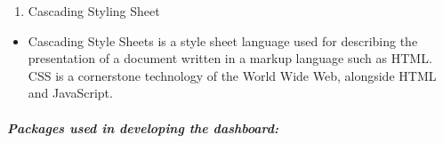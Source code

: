 \documentclass[
]{article}
\providecommand{\tightlist}{%
  \setlength{\itemsep}{0pt}\setlength{\parskip}{0pt}}
\begin{document}
\begin{enumerate}
\def\labelenumi{\arabic{enumi}.}
\setcounter{enumi}{1}
\tightlist
\item
  Cascading Styling Sheet\\
\end{enumerate}

\begin{itemize}
\tightlist
\item
  Cascading Style Sheets is a style sheet language used for describing
  the presentation of a document written in a markup language such as
  HTML. CSS is a cornerstone technology of the World Wide Web, alongside
  HTML and JavaScript.
\end{itemize}

\hypertarget{packages-used-in-developing-the-dashboard}{%
\subparagraph{Packages used in developing the
dashboard:}\label{packages-used-in-developing-the-dashboard}}
\end{document}
